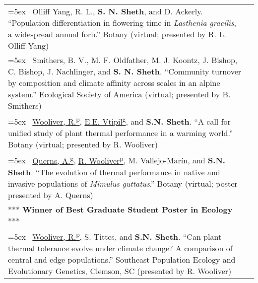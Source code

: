 \documentclass[11pt,english]{article}
\providecommand{\tabularnewline}{\\}
\begin{document}
\begin{tabularx}{\textwidth}{@{}>{\raggedright}p{5.25in} >{\raggedleft}X@{}}
\hangindent=5ex \ Olliff Yang, R. L., \textbf{S. N. Sheth}, and D. Ackerly. ``Population differentiation in flowering time in \emph{Lasthenia gracilis}, a widespread annual forb.'' Botany (virtual; presented by R. L. Olliff Yang) & 2021 \tabularnewline

\hangindent=5ex \ Smithers, B. V., M. F. Oldfather, M. J. Koontz, J. Bishop, C. Bishop, J. Nachlinger, and \textbf{S. N. Sheth}. ``Community turnover by composition and climate affinity across scales in an alpine system.'' Ecological Society of America (virtual; presented by B. Smithers) & 2020 \tabularnewline

\hangindent=5ex \ \underline{Wooliver, R.\textsuperscript{p}}, \underline{E.E. Vtipil\textsuperscript{g}}, and \textbf{S.N. Sheth}. ``A call for unified study of plant thermal performance in a warming world.'' Botany (virtual; presented by R. Wooliver) & 2020 \tabularnewline

\hangindent=5ex \ \underline{Querns, A.\textsuperscript{g}}, \underline{R. Wooliver\textsuperscript{p}}, M. Vallejo-Mar\'in, and \textbf{S.N. Sheth}. ``The evolution of thermal performance in native and invasive populations of \emph{Mimulus guttatus}.'' Botany (virtual; poster presented by A. Querns) & 2020 \tabularnewline
\hspace{7mm} *** \textbf{Winner of Best Graduate Student Poster in Ecology} *** \tabularnewline

\hangindent=5ex \ \underline{Wooliver, R.\textsuperscript{p}}, S. Tittes, and \textbf{S.N. Sheth}. ``Can plant thermal tolerance evolve under climate change? A comparison of central and edge populations.'' Southeast Population Ecology and Evolutionary Genetics, Clemson, SC (presented by R. Wooliver) & 2019 \tabularnewline

\end{tabularx}

\renewcommand{\arraystretch}{1.2}
\end{document}
